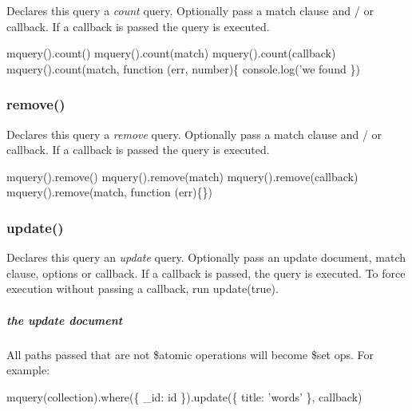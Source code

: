Declares this query a {\itshape count} query. Optionally pass a match clause and / or callback. If a callback is passed the query is executed.


\begin{DoxyCode}
mquery().count()
mquery().count(match)
mquery().count(callback)
mquery().count(match, function (err, number)\{
  console.log('we found %
\})
\end{DoxyCode}


\subsubsection*{remove()}

Declares this query a {\itshape remove} query. Optionally pass a match clause and / or callback. If a callback is passed the query is executed.


\begin{DoxyCode}
mquery().remove()
mquery().remove(match)
mquery().remove(callback)
mquery().remove(match, function (err)\{\})
\end{DoxyCode}


\subsubsection*{update()}

Declares this query an {\itshape update} query. Optionally pass an update document, match clause, options or callback. If a callback is passed, the query is executed. To force execution without passing a callback, run {\ttfamily update(true)}.




\subparagraph*{the update document}

All paths passed that are not {\ttfamily \$atomic} operations will become {\ttfamily \$set} ops. For example\+:


\begin{DoxyCode}
mquery(collection).where(\{ \_id: id \}).update(\{ title: 'words' \}, callback)
\end{DoxyCode}


